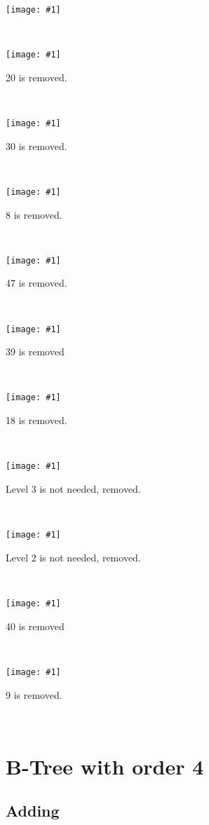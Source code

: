\documentclass[a4paper]{article}
\newcommand{\image}[2] {
  \noindent\begin{minipage}[c]{.6\textwidth}%
    \centering
    \strut\vspace*{-\baselineskip}\newline\texttt{[image: \#1]}
  \end{minipage}%
  \hfill%
  \begin{minipage}[c]{.4\textwidth}
    #2
  \end{minipage}
}
\begin{document}
  \image{skip/del/0.png}{}\vspace{2em}\\
  \image{skip/del/1.png}{\hspace{1em}20 is removed.}\vspace{2em}\\
  \image{skip/del/2.png}{30 is removed.}\vspace{2em}\\
  \image{skip/del/3.png}{8 is removed.}\vspace{2em}\\
  \image{skip/del/4.png}{47 is removed. }\vspace{2em}\\
  \image{skip/del/5.png}{39 is removed }\vspace{2em}\\
  \image{skip/del/6.png}{18 is removed. }\vspace{2em}\\
  \image{skip/del/7.png}{Level 3 is not needed, removed. }\vspace{2em}\\
  \image{skip/del/8.png}{ Level 2 is not needed, removed. }\vspace{2em}\\
  \image{skip/del/9.png}{40 is removed }\vspace{2em}\\
  \image{skip/del/10.png}{9 is removed. }\vspace{2em}\\
  

  \newpage
  \section{B-Tree with order 4}

  \subsection{Adding}
\end{document}
